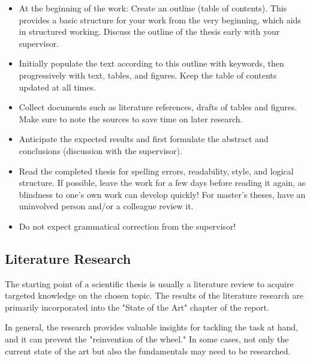 \documentclass[a4paper, fleqn, headsepline, footsepline, 12pt, parskip=half]{scrartcl}
\begin{document}
\begin{itemize}
    \item At the beginning of the work: Create an outline (table of contents). This provides a basic structure for your work from the very beginning, which aids in structured working. Discuss the outline of the thesis early with your supervisor.
    \item Initially populate the text according to this outline with keywords, then progressively with text, tables, and figures. Keep the table of contents updated at all times.
    \item Collect documents such as literature references, drafts of tables and figures. Make sure to note the sources to save time on later research.
    \item Anticipate the expected results and first formulate the abstract and conclusions (discussion with the supervisor).
    \item Read the completed thesis for spelling errors, readability, style, and logical structure. If possible, leave the work for a few days before reading it again, as blindness to one's own work can develop quickly! For master's theses, have an uninvolved person and/or a colleague review it.
    \item Do not expect grammatical correction from the supervisor!
\end{itemize}


\subsection{Literature Research}
\label{sec:literatureResearch}

The starting point of a scientific thesis is usually a literature review to acquire targeted knowledge on the chosen topic. The results of the literature research are primarily incorporated into the "State of the Art" chapter of the report.

In general, the research provides valuable insights for tackling the task at hand, and it can prevent the "reinvention of the wheel." In some cases, not only the current state of the art but also the fundamentals may need to be researched.
\end{document}
